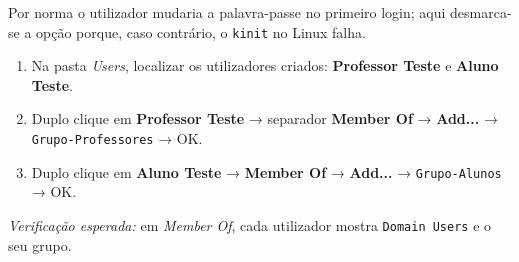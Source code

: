 \begin{simplesbox}
Por norma o utilizador mudaria a palavra-passe no primeiro login; aqui desmarca-se a opção porque, caso contrário, o \texttt{kinit} no Linux falha.
\end{simplesbox}


\begin{enumerate}
\item Na pasta \emph{Users}, localizar os utilizadores criados: \textbf{Professor Teste} e \textbf{Aluno Teste}.
\item Duplo clique em \textbf{Professor Teste} → separador \textbf{Member Of} → \textbf{Add...} → \texttt{Grupo-Professores} → OK.
\item Duplo clique em \textbf{Aluno Teste} → \textbf{Member Of} → \textbf{Add...} → \texttt{Grupo-Alunos} → OK.
\end{enumerate}

\emph{Verificação esperada:} em \emph{Member Of}, cada utilizador mostra \texttt{Domain Users} e o seu grupo.

